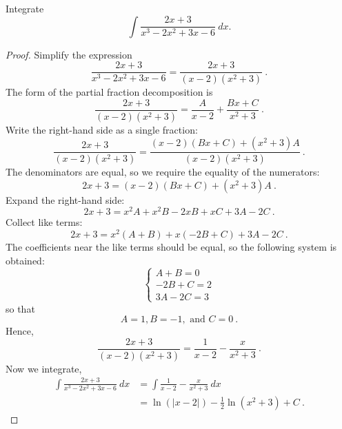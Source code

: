 \documentclass[compacto,10pt,comentarios]{aleph-notas}
\begin{document}
\begin{ejer}
    Integrate
    $$
        \int \frac{2x+3}{x^3-2x^2+3x-6} ~ dx.
    $$
\end{ejer}
\begin{proof}
    Simplify the expression
    $$
        \frac{2 x + 3}{x^{3} - 2 x^{2} + 3 x - 6}=\frac{2 x + 3}{\left(x - 2\right) \left(x^{2} + 3\right)} ~ .
    $$
    The form of the partial fraction decomposition is
    $$
        \frac{2 x + 3}{\left(x - 2\right) \left(x^{2} + 3\right)}=\frac{A}{x - 2}+\frac{B x + C}{x^{2} + 3} ~ .
    $$
    Write the right-hand side as a single fraction:
    $$
        \frac{2 x + 3}{\left(x - 2\right) \left(x^{2} + 3\right)}=\frac{\left(x - 2\right) \left(B x + C\right) + \left(x^{2} + 3\right) A}{\left(x - 2\right) \left(x^{2} + 3\right)} ~ .
    $$
    The denominators are equal, so we require the equality of the numerators:
    $$
        2 x + 3=\left(x - 2\right) \left(B x + C\right) + \left(x^{2} + 3\right) A ~ .
    $$
    Expand the right-hand side:
    $$
        2 x + 3=x^{2} A + x^{2} B - 2 x B + x C + 3 A - 2 C ~ .
    $$
    Collect like terms:
    $$
        2 x + 3=x^{2} \left(A + B\right) + x \left(- 2 B + C\right) + 3 A - 2 C ~ .
    $$
    The coefficients near the like terms should be equal, so the following system is obtained:
    $$
        \begin{cases} A + B = 0\\- 2 B + C = 2\\3 A - 2 C = 3 \end{cases}
    $$
    so that
    $$
        A = 1, B = -1, \text{ and } C = 0 ~ .
    $$
    Hence,
    $$
        \frac{2 x + 3}{\left(x - 2\right) \left(x^{2} + 3\right)}=\frac{1}{x - 2} - \frac{x}{x^{2} + 3} ~ .
    $$
    Now we integrate,
    \begin{align*}
        \int \frac{2x+3}{x^3-2x^2+3x-6} ~ dx
        & = \int \frac{1}{x - 2}-\frac{x}{x^{2} + 3} ~ dx \\
        & = \ln(|x - 2|) - \frac{1}{2} \ln(x^2 + 3) + C ~ .
    \end{align*}

\end{proof}
\end{document}
